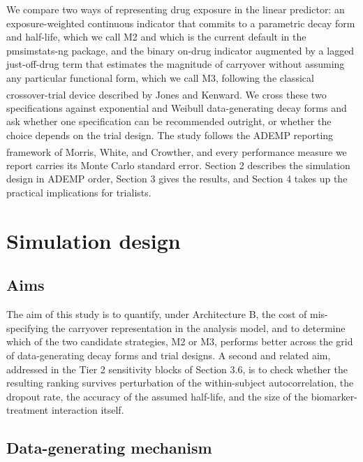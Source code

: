 \documentclass[
  11pt,
]{article}
\begin{document}
We compare two ways of representing drug exposure in the linear
predictor: an exposure-weighted continuous indicator that commits to
a parametric decay form and half-life, which we call M2 and which is
the current default in the pmsimstats-ng package, and the binary
on-drug indicator augmented by a lagged just-off-drug term that
estimates the magnitude of carryover without assuming any particular
functional form, which we call M3, following the classical
crossover-trial device described by Jones and Kenward\textsuperscript{}. We cross these two specifications against
exponential and Weibull data-generating decay forms and ask whether
one specification can be recommended outright, or whether the choice
depends on the trial design. The study follows the ADEMP reporting
framework of Morris, White, and Crowther\textsuperscript{}, and every performance measure we report
carries its Monte Carlo standard error. Section 2 describes the
simulation design in ADEMP order, Section 3 gives the results, and
Section 4 takes up the practical implications for trialists.

\section{Simulation design}\label{simulation-design}

\subsection{Aims}\label{aims}

The aim of this study is to quantify, under Architecture B, the cost
of mis-specifying the carryover representation in the analysis
model, and to determine which of the two candidate strategies, M2 or
M3, performs better across the grid of data-generating decay forms
and trial designs. A second and related aim, addressed in the Tier 2
sensitivity blocks of Section 3.6, is to check whether the resulting
ranking survives perturbation of the within-subject autocorrelation,
the dropout rate, the accuracy of the assumed half-life, and the
size of the biomarker-treatment interaction itself.

\subsection{Data-generating mechanism}\label{data-generating-mechanism}
\end{document}
